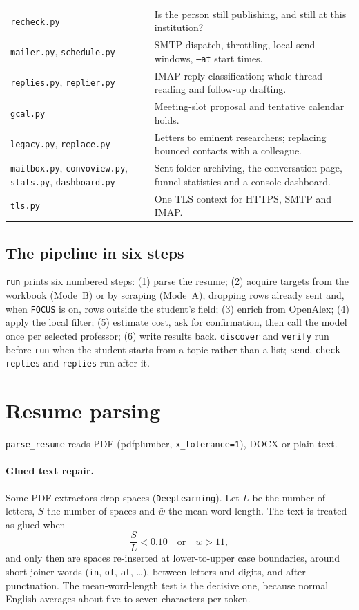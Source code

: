 \documentclass[11pt,a4paper]{article}
\newcommand{\code}[1]{\texttt{#1}}
\begin{document}
\begin{tabularx}{\linewidth}{@{}lX@{}}
\code{recheck.py} & Is the person still publishing, and still at this institution? \\
\code{mailer.py}, \code{schedule.py} & SMTP dispatch, throttling, local send windows,
\code{--at} start times. \\
\code{replies.py}, \code{replier.py} & IMAP reply classification; whole-thread reading and
follow-up drafting. \\
\code{gcal.py} & Meeting-slot proposal and tentative calendar holds. \\
\code{legacy.py}, \code{replace.py} & Letters to eminent researchers; replacing bounced
contacts with a colleague. \\
\code{mailbox.py}, \code{convoview.py}, \code{stats.py}, \code{dashboard.py} & Sent-folder
archiving, the conversation page, funnel statistics and a console dashboard. \\
\code{tls.py} & One TLS context for HTTPS, SMTP and IMAP. \\
\bottomrule
\end{tabularx}

\subsection{The pipeline in six steps}
\code{run} prints six numbered steps: (1) parse the resume; (2) acquire targets from the
workbook (Mode~B) or by scraping (Mode~A), dropping rows already sent and, when \code{FOCUS} is
on, rows outside the student's field; (3) enrich from OpenAlex; (4) apply the local filter;
(5) estimate cost, ask for confirmation, then call the model once per selected professor;
(6) write results back. \code{discover} and \code{verify} run before \code{run} when the
student starts from a topic rather than a list; \code{send}, \code{check-replies} and
\code{replies} run after it.

\section{Resume parsing}

\code{parse\_resume} reads PDF (pdfplumber, \code{x\_tolerance=1}), DOCX or plain text.

\paragraph{Glued text repair.} Some PDF extractors drop spaces (\code{DeepLearning}). Let
$L$ be the number of letters, $S$ the number of spaces and $\bar w$ the mean word length. The
text is treated as glued when
\[
  \frac{S}{L} < 0.10 \quad\text{or}\quad \bar w > 11 ,
\]
and only then are spaces re-inserted at lower-to-upper case boundaries, around short joiner
words (\code{in}, \code{of}, \code{at}, \ldots), between letters and digits, and after
punctuation. The mean-word-length test is the decisive one, because normal English averages
about five to seven characters per token.
\end{document}
